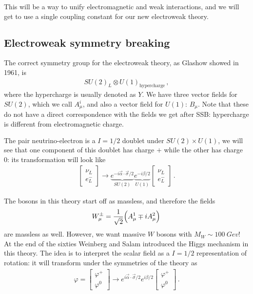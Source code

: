 \documentclass[main.tex]{subfiles}
\begin{document}

This will be a way to unify electromagnetic and weak interactions, and we will get to use a single coupling constant for our new electroweak theory.

\subsection{Electroweak symmetry breaking}

The correct symmetry group for the electroweak theory, as Glashow showed in 1961, is 
%
\begin{align}
SU(2)_{L} \otimes U(1) _{\text{hypercharge}}
\,,
\end{align}
%
where the hypercharge is usually denoted as \(Y\).
We have three vector fields for \(SU(2)\), which we call \(A_{\mu}^{i}\), and also a vector field for \(U(1)\): \(B_{\mu }\).
Note that these do not have a direct correspondence with the fields we get after SSB: hypercharge is different from electromagnetic charge.

The pair neutrino-electron is a \(I = 1/2\) doublet under \(SU(2) \times U(1)\), we will see that one component of this doublet has charge \(+\) while the other has charge 0: its transformation will look like 
%
\begin{align}
\left[\begin{array}{c}
\nu_{L} \\ 
e^{-}_{L}
\end{array}\right]
\to 
\underbrace{e^{-i \vec{\alpha} \cdot \vec{\sigma} / 2}}_{SU(2)}
\underbrace{e^{-i \beta  /2 }}_{U(1)}
\left[\begin{array}{c}
\nu_{L} \\ 
e^{-}_{L}
\end{array}\right]
\,.
\end{align}

The bosons in this theory start off as massless, and therefore the fields 
%
\begin{align}
W^{\pm}_{\mu } = \frac{1}{\sqrt{2}}  \qty(A^{1}_{\mu } \mp i A^{2}_{\mu })
\,
\end{align}
%
are massless as well. However, we want massive \(W\) bosons with \(M_W \sim \SI{100}{Gev}\)! 
At the end of the sixties Weinberg and Salam introduced the Higgs mechanism in this theory. 
The idea is to interpret the scalar field as a \(I= 1/2\) representation of rotation: it will transform under the symmetries of the theory as 
%
\begin{align}
\varphi =
\left[\begin{array}{c}
\varphi^{+} \\ 
\varphi^{0}
\end{array}\right]
\to 
e^{i \vec{\alpha} \cdot \vec{\sigma} /2}
e^{i \beta / 2}
\left[\begin{array}{c}
\varphi^{+} \\ 
\varphi^{0}
\end{array}\right]
\,.
\end{align}
\end{document}
